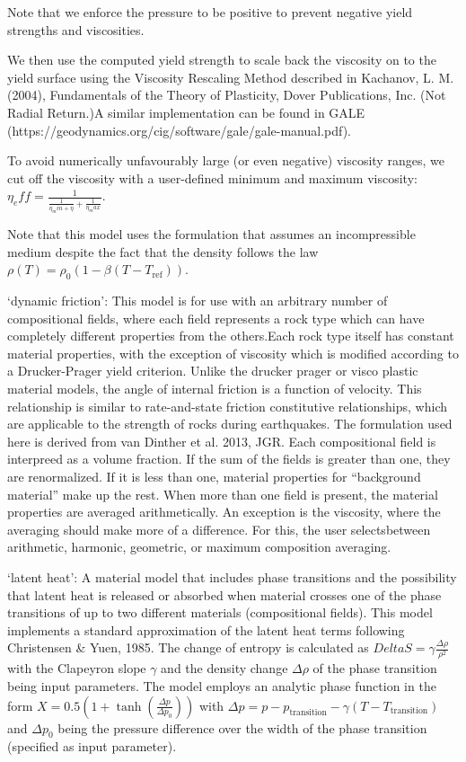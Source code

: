 \begin{itemize}
Note that we enforce the pressure to be positive to prevent negative yield strengths and viscosities. 

We then use the computed yield strength to scale back the viscosity on to the yield surface using the Viscosity Rescaling Method described in Kachanov, L. M. (2004), Fundamentals of the Theory of Plasticity, Dover Publications, Inc. (Not Radial Return.)A similar implementation can be found in GALE (https://geodynamics.org/cig/software/gale/gale-manual.pdf). 

To avoid numerically unfavourably large (or even negative) viscosity ranges, we cut off the viscosity with a user-defined minimum and maximum viscosity: $\eta_eff = \frac{1}{\frac{1}{\eta_min + \eta}+ \frac{1}{\eta_max}}$. 

Note that this model uses the formulation that assumes an incompressible medium despite the fact that the density follows the law $\rho(T)=\rho_0(1-\beta(T-T_{\text{ref}}))$. 

`dynamic friction': This model is for use with an arbitrary number of compositional fields, where each field represents a rock type which can have completely different properties from the others.Each rock type itself has constant material properties, with the exception of viscosity which is modified according to a Drucker-Prager yield criterion. Unlike the drucker prager or visco plastic material models, the angle of internal friction is a function of velocity. This relationship is similar to rate-and-state friction constitutive relationships, which are applicable to the strength of rocks during earthquakes. The formulation used here is derived from van Dinther et al. 2013, JGR. Each compositional field is interpreed as a volume fraction. If the sum of the fields is greater than one, they are renormalized. If it is less than one, material properties for ``background material'' make up the rest. When more than one field is present, the material properties are averaged arithmetically. An exception is the viscosity, where the averaging should make more of a difference. For this, the user selectsbetween arithmetic, harmonic, geometric, or maximum composition averaging. 

`latent heat': A material model that includes phase transitions and the possibility that latent heat is released or absorbed when material crosses one of the phase transitions of up to two different materials (compositional fields). This model implements a standard approximation of the latent heat terms following Christensen \& Yuen, 1985. The change of entropy is calculated as $Delta S = \gamma \frac{\Delta\rho}{\rho^2}$ with the Clapeyron slope $\gamma$ and the density change $\Delta\rho$ of the phase transition being input parameters. The model employs an analytic phase function in the form $X=0.5 \left( 1 + \tanh \left( \frac{\Delta p}{\Delta p_0} \right) \right)$ with $\Delta p = p - p_\text{transition} - \gamma \left( T - T_\text{transition} \right)$ and $\Delta p_0$ being the pressure difference over the width of the phase transition (specified as input parameter).


\end{itemize}
